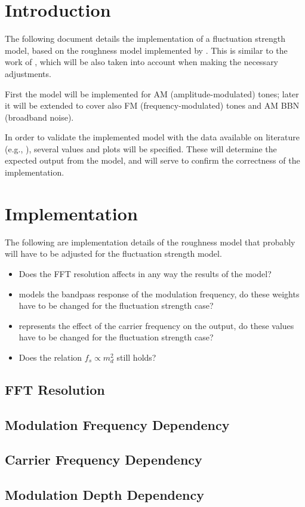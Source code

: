 \documentclass[a4paper]{article}
\begin{document}

\section{Introduction}

The following document details the implementation of a fluctuation strength
model, based on the roughness model implemented by \citeauthor{Schrader2002}.
This is similar to the work of \citeauthor{Sontacchi1998}, which will be also
taken into account when making the necessary adjustments.

First the model will be implemented for AM (amplitude-modulated) tones; later it
will be extended to cover also FM (frequency-modulated) tones and AM BBN
(broadband noise).

In order to validate the implemented model with the data available on literature
(e.g., \citeauthor{Fastl2007Psychoacoustics}), several values and plots will be
specified. These will determine the expected output from the model, and will
serve to confirm the correctness of the implementation.

\section{Implementation}

The following are implementation details of the roughness model that probably
will have to be adjusted for the fluctuation strength model.

\begin{itemize}
    \item Does the FFT resolution affects in any way the results of the model?
    \item {} models the bandpass response of the modulation
        frequency, do these weights have to be changed for the fluctuation
        strength case?
    \item {} represents the effect of the carrier frequency on
        the output, do these values have to be changed for the fluctuation
        strength case?
    \item Does the relation $f_s \propto m_d ^ 2$ still holds?
\end{itemize}

\subsection{FFT Resolution}

\subsection{Modulation Frequency Dependency}

\subsection{Carrier Frequency Dependency}

\subsection{Modulation Depth Dependency}



\end{document}
